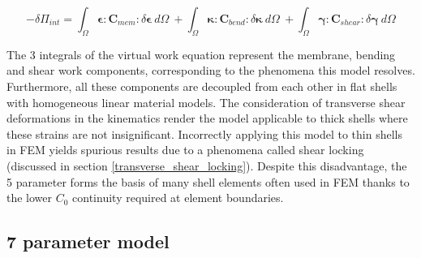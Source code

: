 \begin{equation} 
-\delta\Pi_{int} =
\int_\Omega
\boldsymbol{\epsilon}
:
\mathbf{C}_{mem}
:
\delta \boldsymbol{\epsilon}\ d \Omega\ 
+
\int_\Omega
\boldsymbol{\kappa}
:
\mathbf{C}_{bend}
:
\delta \boldsymbol{\kappa}\ 
d \Omega\ 
+
\int_\Omega
\boldsymbol{\gamma}
:
\mathbf{C}_{shear}
:
\delta \boldsymbol{\gamma}\ 
d \Omega
\label{eqsrm4}
\end{equation}


The 3 integrals of the virtual work equation represent the membrane, bending and shear work components, corresponding to the phenomena this model resolves. Furthermore, all these components are decoupled from each other in flat shells with homogeneous linear material models. The consideration of transverse shear deformations in the kinematics render the model applicable to thick shells where these strains are not insignificant. Incorrectly applying this model to thin shells in FEM yields spurious results due to a phenomena called shear locking (discussed in section \ref{transverse_shear_locking}). Despite this disadvantage, the 5 parameter forms the basis of many shell elements often used in FEM thanks to the lower $C_0$ continuity required at element boundaries.

\subsection{7 parameter model}

